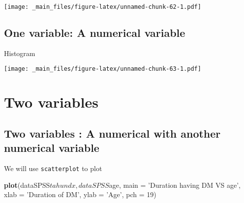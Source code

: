 \documentclass[]{book}
\newenvironment{Shaded}{\begin{snugshade}}{\end{snugshade}}
\newcommand{\KeywordTok}[1]{\textcolor[rgb]{0.13,0.29,0.53}{\textbf{{#1}}}}
\newcommand{\DataTypeTok}[1]{\textcolor[rgb]{0.13,0.29,0.53}{{#1}}}
\newcommand{\DecValTok}[1]{\textcolor[rgb]{0.00,0.00,0.81}{{#1}}}
\newcommand{\StringTok}[1]{\textcolor[rgb]{0.31,0.60,0.02}{{#1}}}
\newcommand{\NormalTok}[1]{{#1}}
\theoremstyle{definition}
\theoremstyle{definition}
\theoremstyle{remark}
\begin{document}
\begin{Shaded}
\end{Shaded}

\texttt{[image: \_main\_files/figure-latex/unnamed-chunk-62-1.pdf]}

\subsection{One variable: A numerical
variable}\label{one-variable-a-numerical-variable}

Histogram

\begin{Shaded}
\end{Shaded}

\texttt{[image: \_main\_files/figure-latex/unnamed-chunk-63-1.pdf]}

\section{Two variables}\label{two-variables}

\subsection{Two variables : A numerical with another numerical
variable}\label{two-variables-a-numerical-with-another-numerical-variable}

We will use \texttt{scatterplot} to plot

\begin{Shaded}
\begin{Highlighting}[]
\KeywordTok{plot}\NormalTok{(dataSPSS$tahundx, dataSPSS$age,}
     \DataTypeTok{main =} \StringTok{'Duration having DM VS age'}\NormalTok{,}
     \DataTypeTok{xlab =} \StringTok{'Duration of DM'}\NormalTok{, }\DataTypeTok{ylab =} \StringTok{'Age'}\NormalTok{,}
     \DataTypeTok{pch =} \DecValTok{19}\NormalTok{)}
\end{Highlighting}
\end{Shaded}
\end{document}

